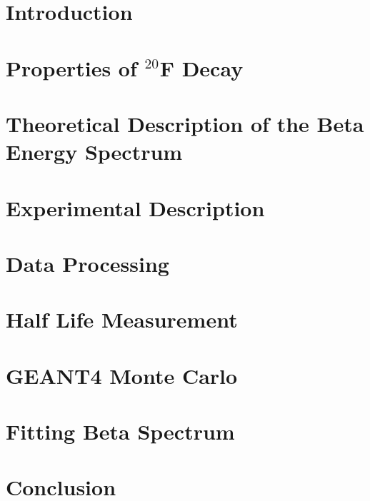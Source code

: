 \documentclass{msuphddissertation}
\begin{document}
\newpage
{}
\begin{doublespace}

\chapter{Introduction}


\chapter{Properties of $^{20}$F Decay} 


\chapter{Theoretical Description of the Beta Energy Spectrum}
\label{ch:theory}


\chapter{Experimental Description}


\chapter{Data Processing}


\chapter{Half Life Measurement}


\chapter{GEANT4 Monte Carlo}


\chapter{Fitting Beta Spectrum}


\chapter{Conclusion}

\end{doublespace}
\end{document}
